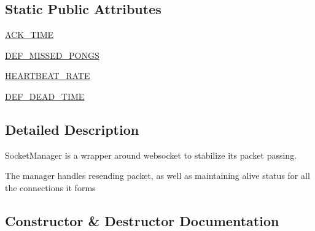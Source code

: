 \subsection*{Static Public Attributes}
\begin{DoxyCompactItemize}
\item 
\hyperlink{classparlai_1_1mturk_1_1core_1_1legacy__2018_1_1socket__manager_1_1SocketManager_ab9e91e6d31b0a8cbee08a69cd5d54c99}{A\+C\+K\+\_\+\+T\+I\+ME}
\item 
\hyperlink{classparlai_1_1mturk_1_1core_1_1legacy__2018_1_1socket__manager_1_1SocketManager_a0f241edfe6db02a1d9b5c0a54b7d1447}{D\+E\+F\+\_\+\+M\+I\+S\+S\+E\+D\+\_\+\+P\+O\+N\+GS}
\item 
\hyperlink{classparlai_1_1mturk_1_1core_1_1legacy__2018_1_1socket__manager_1_1SocketManager_afa855d56173d233a1dc79bb2eebc6307}{H\+E\+A\+R\+T\+B\+E\+A\+T\+\_\+\+R\+A\+TE}
\item 
\hyperlink{classparlai_1_1mturk_1_1core_1_1legacy__2018_1_1socket__manager_1_1SocketManager_a95f11e1f710c96100b9edaf289604b79}{D\+E\+F\+\_\+\+D\+E\+A\+D\+\_\+\+T\+I\+ME}
\end{DoxyCompactItemize}


\subsection{Detailed Description}
\begin{DoxyVerb}SocketManager is a wrapper around websocket to stabilize its packet passing.

The manager handles resending packet, as well as maintaining alive status for all
the connections it forms
\end{DoxyVerb}
 

\subsection{Constructor \& Destructor Documentation}
\mbox{\label{classparlai_1_1mturk_1_1core_1_1legacy__2018_1_1socket__manager_1_1SocketManager_ac4a8060782edd077f684e1f90a04f75d}} 

